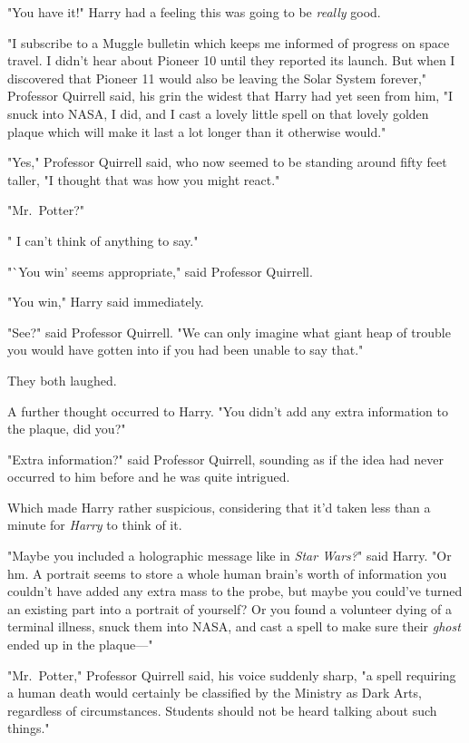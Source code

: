 "You have it!" Harry had a feeling this was going to be \emph{really} good.

"I subscribe to a Muggle bulletin which keeps me informed of progress on space
travel. I didn't hear about Pioneer 10 until they reported its launch. But when
I discovered that Pioneer 11 would also be leaving the Solar System forever,"
Professor Quirrell said, his grin the widest that Harry had yet seen from him,
"I snuck into NASA, I did, and I cast a lovely little spell on that lovely
golden plaque which will make it last a lot longer than it otherwise would."

{\el}

{\el}

{\el}

"Yes," Professor Quirrell said, who now seemed to be standing around fifty feet
taller, "I thought that was how you might react."

{\el}

{\el}

{\el}

"Mr.~Potter?"

"{\el} I can't think of anything to say."

"`You win' seems appropriate," said Professor Quirrell.

"You win," Harry said immediately.

"See?" said Professor Quirrell. "We can only imagine what giant heap of trouble
you would have gotten into if you had been unable to say that."

They both laughed.

A further thought occurred to Harry. "You didn't add any extra information to
the plaque, did you?"

"Extra information?" said Professor Quirrell, sounding as if the idea had never
occurred to him before and he was quite intrigued.

Which made Harry rather suspicious, considering that it'd taken less than a
minute for \emph{Harry} to think of it.

"Maybe you included a holographic message like in \emph{Star Wars?}" said
Harry. "Or{\el} hm. A portrait seems to store a whole human brain's worth of
information{\el} you couldn't have added any extra mass to the probe, but
maybe you could've turned an existing part into a portrait of yourself? Or you
found a volunteer dying of a terminal illness, snuck them into NASA, and cast a
spell to make sure their \emph{ghost} ended up in the plaque—"

"Mr.~Potter," Professor Quirrell said, his voice suddenly sharp, "a spell
requiring a human death would certainly be classified by the Ministry as Dark
Arts, regardless of circumstances. Students should not be heard talking about
such things."

